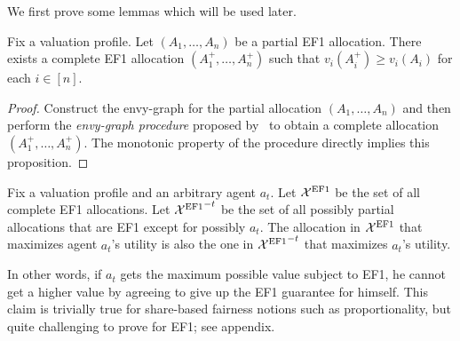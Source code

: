 We first prove some lemmas which will be used later.
\begin{lemma}\label{prop:partialtocomplete}
    Fix a valuation profile. Let $(A_1,\ldots,A_n)$ be a partial EF1 allocation. There exists a complete EF1 allocation $(A_1^+,\ldots,A_n^+)$ such that $v_i(A_i^+)\geq v_i(A_i)$ for each $i\in [n]$.
\end{lemma}
\begin{proof}
    Construct the envy-graph for the partial allocation $(A_1,\ldots,A_n)$ and then perform the \emph{envy-graph procedure} proposed by~\citet{lipton2004approximately} to obtain a complete allocation $(A_1^+,\ldots,A_n^+)$.
    The monotonic property of the procedure directly implies this proposition.
\end{proof}

\begin{lemmarep}\label{prop:maximuminexception}
    Fix a valuation profile and an arbitrary agent $a_{t}$. Let $\mathcal{X}^{\mathrm{EF1}}$ be the set of all complete EF1 allocations. Let ${\mathcal{X}^{\mathrm{EF1}}}^{-t}$ be the set of all possibly partial allocations that are EF1 except for possibly $a_t$. The allocation in $\mathcal{X}^{\mathrm{EF1}}$ that maximizes agent $a_t$'s utility is also the one in ${\mathcal{X}^{\mathrm{EF1}}}^{-t}$ that maximizes $a_t$'s utility.
\end{lemmarep}
In other words, if $a_t$ gets the maximum possible value subject to EF1, he cannot get a higher value by agreeing to give up the EF1 guarantee for himself.
This claim is trivially true for share-based fairness notions such as proportionality, but quite challenging to prove for EF1; see appendix.

